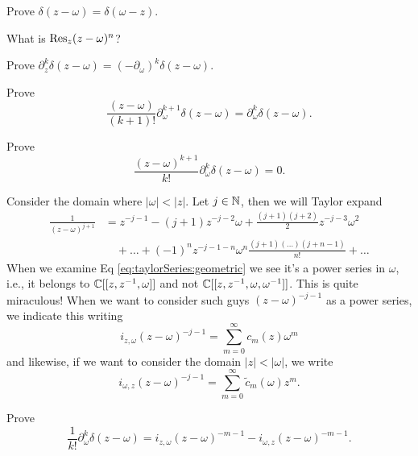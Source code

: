 \begin{xca}
Prove $\delta(z-\omega)=\delta(\omega-z)$.
\end{xca}
\begin{xca}
What is $\Res[z]{(z-\omega)^{n}}$?
\end{xca}
\begin{xca}
Prove $\partial^{k}_{z}\delta(z-\omega)=(-\partial_{\omega})^{k}\delta(z-\omega)$.
\end{xca}
\begin{xca}\label{xca:deltaDerivative}%
Prove $$\frac{(z-\omega)}{(k+1)!}\partial^{k+1}_{\omega}\delta(z-\omega)=\partial^{k}_{\omega}\delta(z-\omega).$$
\end{xca}
\begin{xca}\label{xca:usefulForCor3}%
Prove $$\frac{(z-\omega)^{k+1}}{k!}\partial^{k}_{\omega}\delta(z-\omega)=0.$$
\end{xca}

\M
Consider the domain where $|\omega|<|z|$. Let $j\in\NN$, then we will 
Taylor expand
\begin{equation}\label{eq:taylorSeries:geometric}
\begin{split}
\frac{1}{(z-\omega)^{j+1}}&=z^{-j-1}-(j+1)z^{-j-2}\omega+\frac{(j+1)(j+2)}{2}z^{-j-3}\omega^{2}\\
&\quad+\dots+(-1)^{n}z^{-j-1-n}\omega^{n}\frac{(j+1)(\dots)(j+n-1)}{n!}+\dots
\end{split}
\end{equation}
When we examine Eq \eqref{eq:taylorSeries:geometric} we see it's a power series
in $\omega$, i.e., it belongs to $\CC[[z,z^{-1},\omega]]$ and not 
$\CC[[z,z^{-1},\omega,\omega^{-1}]]$. This is quite miraculous! When we want to 
consider such guys $(z-\omega)^{-j-1}$ as a power series, we indicate this 
writing
\begin{equation}
i_{z,\omega}(z-\omega)^{-j-1}=\sum^{\infty}_{m=0}c_{m}(z)\omega^{m}
\end{equation}
and likewise, if we want to consider the domain $|z|<|\omega|$, we write
\begin{equation}
i_{\omega,z}(z-\omega)^{-j-1}=\sum^{\infty}_{m=0}\widetilde{c}_{m}(\omega)z^{m}.
\end{equation}
\begin{xca}
Prove 
\begin{equation}
\frac{1}{k!}\partial^{k}_{\omega}\delta(z-\omega)=i_{z,\omega}(z-\omega)^{-m-1}
-i_{\omega,z}(z-\omega)^{-m-1}.
\end{equation}
\end{xca}


